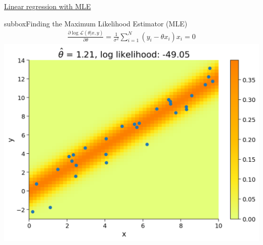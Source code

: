 \begin{textbox}{\href{https://compneuro.neuromatch.io/tutorials/W1D2_ModelFitting/student/W1D2_Tutorial2.html}{Linear regression with MLE }   }
\begin{subbox}{subbox}{Finding the Maximum Likelihood Estimator (MLE)}
\begin{align}
\frac{\partial\operatorname{log}\mathcal{L}(\theta|x,y)}{\partial\theta}=\frac{1}{\sigma^2}\sum_{i=1}^N(y_i-\theta x_i)x_i = 0
\end{align}
\centering
\includegraphics[scale=0.2]{Figures/ModelFitting/MFFigure2.png}
\end{subbox}
\end{textbox}
